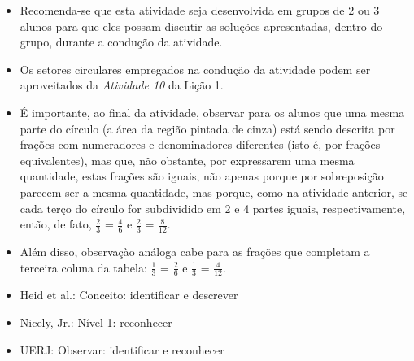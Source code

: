 \begin{multicols}{2}
 
\begin{itemize} %
    \item       Recomenda-se que esta atividade seja desenvolvida em grupos de   
    $2$       ou       $3$       alunos para que eles possam discutir as 
soluções apresentadas, dentro do grupo, durante a condução da atividade.
    \item       Os setores circulares empregados na condução da atividade podem 
ser aproveitados da \emph{Atividade 10}       da Lição 1.
    \item       É importante, ao final da atividade, observar para os alunos que 
uma mesma parte do círculo (a área da região pintada de cinza) está sendo 
descrita por frações com numeradores e denominadores diferentes (isto é, por 
frações equivalentes), mas que, não obstante, por expressarem uma mesma 
quantidade, estas frações são iguais, não apenas porque por sobreposição parecem 
ser a mesma quantidade, mas porque, como na atividade anterior, se cada terço do 
círculo for subdividido em 2 e 4 partes iguais, respectivamente, então, de fato, 
      $\frac{2}{3}$       =       $\frac{4}{6}$       e       $\frac{2}{3}$      
 =       $\frac{8}{12}$.
    \item       Além disso, observaçào análoga cabe para as frações que 
completam a terceira coluna da tabela:       $\frac{1}{3}$       =       
$\frac{2}{6}$       e       $\frac{1}{3}$       =       $\frac{4}{12}$.
\end{itemize} %
  
   \vspace{.1cm}
  
 \vspace{.1cm}
  
\begin{itemize} %
    \item       Heid et al.: Conceito: identificar e descrever
    \item       Nicely, Jr.: Nível 1: reconhecer
    \item       UERJ: Observar: identificar e reconhecer
\end{itemize} %


\end{multicols}
